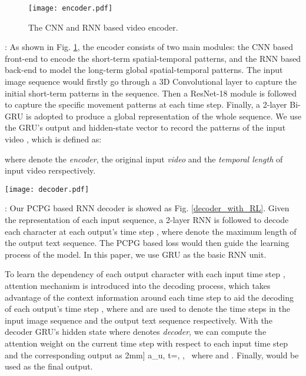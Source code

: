 \documentclass[a4paper, 10pt, conference]{ieeeconf}      \usepackage{FG2020}
\begin{document}
\begin{figure}[htb]
	\setlength{\abovecaptionskip}{0.2cm}
	\setlength{\belowcaptionskip}{-0.2cm} 
	\centering
	\texttt{[image: encoder.pdf]}
	\caption{The CNN and RNN based video encoder. }\label{vid_encoder_fig}\end{figure}
\vspace{0.2cm}
: As shown in Fig. \ref{vid_encoder_fig}, the encoder consists of two main modules: the CNN based front-end to encode the short-term spatial-temporal patterns, and the RNN based back-end to model the long-term global spatial-temporal patterns. The input image sequence would firstly go through a 3D Convolutional layer to capture the initial short-term patterns in the sequence. Then a ResNet-18 \cite{He} module is followed to capture the specific movement patterns at each time step. Finally, a 2-layer Bi-GRU is adopted to produce a global representation of the whole sequence. We use the GRU's output  and hidden-state vector  to record the patterns of the input video , which is defined as:

where  denote the \textit{encoder}, the original input \textit{video} and the \textit{temporal length} of input video rerspectively.

\begin{figure*}
	\setlength{\abovecaptionskip}{0.05cm}
	\setlength{\belowcaptionskip}{-0.3cm} 
	\centering
	\texttt{[image: decoder.pdf]}
	\caption{The Optimization of PCPG based learning process. Each output at the previous time step will feedback to the agent (GRU decoder) as the input. And the environment will feedback on an immediate reward when taking an action (choosing a character at each time step). To calculate the gradient for model updating, we utilize Monte Carlo sampling to sample M transcription sequences, leading to M output character sequences which would be taken to compute the PCPG loss.}\label{decoder_with_RL}
\end{figure*} 

: Our PCPG based RNN decoder is showed as Fig. \ref{decoder_with_RL}. Given the representation of each input sequence, a 2-layer RNN is followed to decode each character at each output's time step , where  denote the maximum length of the output text sequence. The PCPG based loss would then guide the learning process of the model. In this paper, we use GRU as the basic RNN unit. 

To learn the dependency of each output character with each input time step  , attention mechanism is introduced into the decoding process, which takes advantage of the context information around each time step  to aid the decoding of each output's time step , where  and  are used to denote the time steps in the input image sequence and the output text sequence respectively. With the decoder GRU's hidden state   where  denotes \textit{decoder}, we can compute the attention weight  on the current time step  with respect to each input time step  and the corresponding output  as 
2mm] 
{{a}_{u, t}=}, , \
where  and . Finally,  would be used as the final output.
\end{document}
